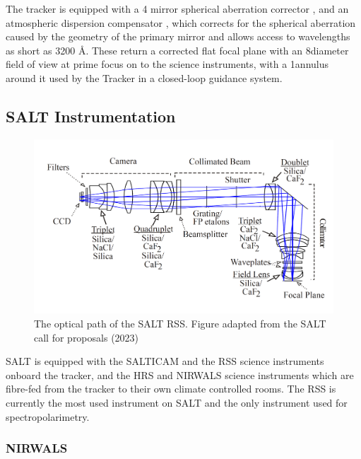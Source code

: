 The tracker is equipped with a 4 mirror spherical aberration corrector \citep{SALT_SAC}, and an atmospheric dispersion compensator \citep{SALT_ADC}, which corrects for the spherical aberration caused by the geometry of the primary mirror and allows access to wavelengths as short as 3200 \AA. These return a corrected flat focal plane with an 8\arcmin diameter field of view at prime focus on to the science instruments, with a 1\arcmin annulus around it used by the Tracker in a closed-loop guidance system.


\subsection{SALT Instrumentation} \label{subsec:SALT_instr}

\begin{figure}[t]
  \centering
  \includegraphics[width = 1.0\textwidth]{figures/2_RSS_optical_path.png}
  \caption{The optical path of the \gls{SALT} \gls{RSS}. Figure adapted from the SALT call for proposals (2023)\protect\footnotemark}
  \label{fig:RSS_layout}
\end{figure}

SALT is equipped with the \gls{SALTICAM} and the \gls{RSS} science instruments onboard the tracker, and the \gls{HRS} and \gls{NIRWALS} science instruments which are fibre-fed from the tracker to their own climate controlled rooms. The \gls{RSS} is currently the most used instrument on \gls{SALT} and the only instrument used for spectropolarimetry.

\subsubsection{\gls{NIRWALS}}

